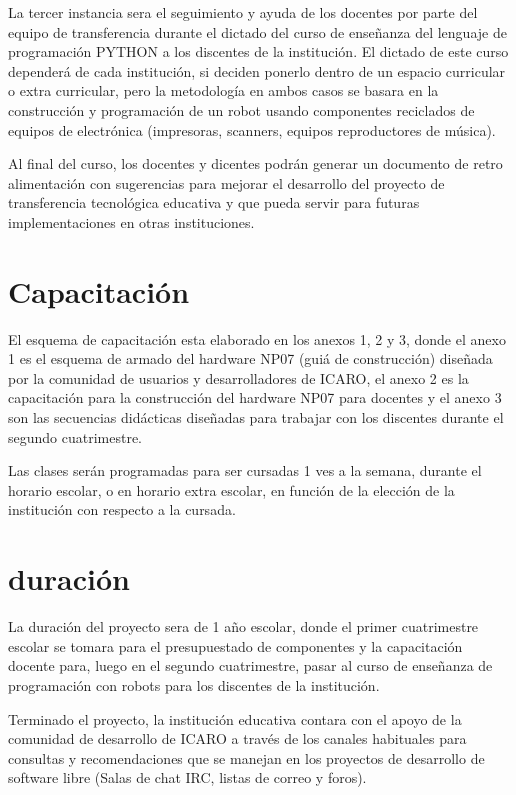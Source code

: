 La tercer instancia sera el seguimiento y ayuda de los docentes por parte del equipo de transferencia durante el dictado del curso de enseñanza del lenguaje de programación PYTHON a los discentes de la institución. El dictado de este curso dependerá de cada institución, si deciden ponerlo dentro de un espacio curricular o extra curricular, pero la metodología en ambos casos se basara en la construcción y programación de un robot usando componentes reciclados de equipos de electrónica (impresoras, scanners, equipos reproductores de música).

Al final del curso, los docentes y dicentes podrán generar un documento de retro alimentación con sugerencias para mejorar el desarrollo del proyecto de transferencia tecnológica educativa y que pueda servir para futuras implementaciones en otras instituciones.

\section{Capacitación}

El esquema de capacitación esta elaborado en los anexos 1, 2 y 3, donde el anexo 1 es el esquema de armado del hardware NP07 (guiá de construcción) diseñada por la comunidad de usuarios y desarrolladores de ICARO, el anexo 2 es la capacitación para la construcción del hardware NP07 para docentes y el anexo 3 son las secuencias didácticas diseñadas para trabajar con los discentes durante el segundo cuatrimestre.

Las clases serán programadas para ser cursadas 1 ves a la semana, durante el horario escolar, o en horario extra escolar, en función de la elección de la institución con respecto a la cursada.

\section{duración}

La duración del proyecto sera de 1 año escolar, donde el primer cuatrimestre escolar se tomara para el presupuestado de componentes y la capacitación docente para, luego en el segundo cuatrimestre, pasar al curso de enseñanza de programación con robots para los discentes de la institución.

Terminado el proyecto, la institución educativa contara con el apoyo de la comunidad de desarrollo de ICARO a través de los canales habituales para consultas y recomendaciones que se manejan en los proyectos de desarrollo de software libre (Salas de chat IRC, listas de correo y foros).

